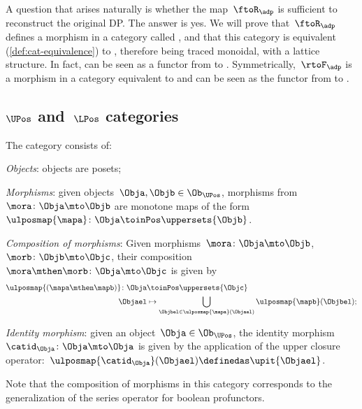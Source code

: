 A question that arises naturally is whether the map~$\ftoR_\adp$ is sufficient to reconstruct the original DP.
The answer is yes.
We will prove that~$\ftoR_\adp$ defines a morphism in a category called \UPos, and that this category is equivalent (\cref{def:cat-equivalence}) to \DP, therefore being traced monoidal, with a lattice structure.
In fact, \FixFunMinRes can be seen as a functor from \DP to \UPos.
Symmetrically,~$\rtoF_\adp$ is a morphism in a category \LPos equivalent to \DP and \FixResMaxFun can be seen as the functor from \DP to \LPos.

\subsection{$\UPos$ and~$\LPos$ categories}

\begin{definition}
    \label{def:upos_cat}
    The category \UPos consists of:
    \begin{compactenum}
        \item \emph{Objects}: objects are posets;
        \item \emph{Morphisms}: given objects~$\Obja,\Objb\in \Ob_{\UPos}$, morphisms from~$\mora\colon \Obja \mto \Objb$ are monotone maps of the form~$\ulposmap{\mapa} \colon \Obja \toinPos \uppersets{\Objb}$.
        \item \emph{Composition of morphisms}: Given morphisms~$\mora\colon \Obja \mto \Objb$,~$\morb\colon \Objb\mto \Objc$, their composition~$\mora\mthen \morb\colon \Obja\mto \Objc$ is given by
        \begin{equation}
            \begin{aligned}
                \ulposmap{(\mapa \mthen \mapb)} \colon \Obja&\toinPos \uppersets{\Objc}\\
                \Objael&\mapsto \bigcup_{\Objbel\in \ulposmap{\mapa}(\Objael)}\ulposmap{\mapb}(\Objbel);
            \end{aligned}
        \end{equation}
        \item \emph{Identity morphism}: given an object~$\Obja\in \Ob_{\UPos}$, the identity morphism~$\catid_\Obja \colon \Obja \mto \Obja$ is given by the application of the upper closure operator:~$\ulposmap{\catid_\Obja}(\Objael)\definedas \upit\{\Objael\}$.
    \end{compactenum}
\end{definition}

\begin{remark}
    Note that the composition of morphisms in this category corresponds to the generalization of the series operator for boolean profunctors.
\end{remark}

